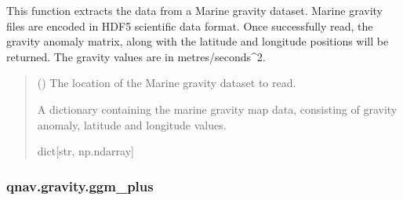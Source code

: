 \documentclass[letterpaper,10pt,english]{sphinxmanual}
\begin{document}
\begin{fulllineitems}
\label{\detokenize{modules/gravity/marine:qnav.gravity.marine.read_marine_file}}
\pysigstartsignatures
{}
\pysigstopsignatures
\sphinxAtStartPar
This function extracts the data from a Marine gravity dataset. Marine
gravity files are encoded in HDF5 scientific data format. Once
successfully read, the gravity anomaly matrix, along with the latitude
and longitude positions will be returned. The gravity values are in
metres/seconds\textasciicircum{}2.
\begin{quote}\begin{description}
\sphinxAtStartPar
{} () \textendash{} The location of the Marine gravity dataset to read.

\sphinxAtStartPar
A dictionary containing the marine gravity map data, consisting
of gravity anomaly, latitude and longitude values.

\sphinxAtStartPar
dict{[}str, np.ndarray{]}

\end{description}\end{quote}

\end{fulllineitems}


\sphinxstepscope


\subsubsection{qnav.gravity.ggm\_plus}
\label{\detokenize{modules/gravity/ggm_plus:module-qnav.gravity.ggm_plus}}\label{\detokenize{modules/gravity/ggm_plus:qnav-gravity-ggm-plus}}\label{\detokenize{modules/gravity/ggm_plus::doc}}
\end{document}
